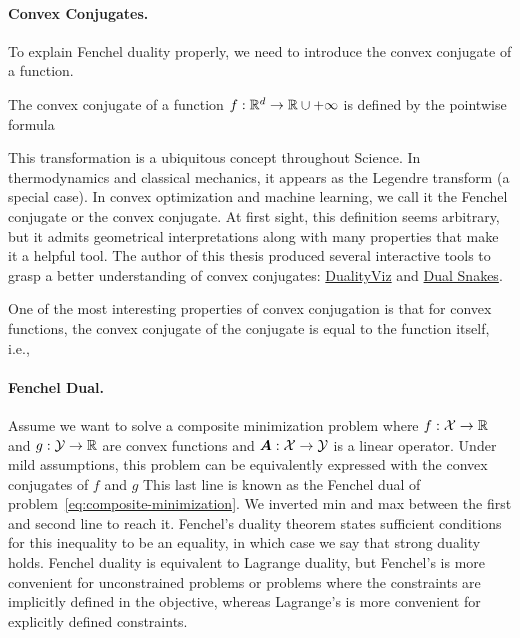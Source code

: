 \paragraph{Convex Conjugates.}
To explain Fenchel duality properly, we need to introduce the convex conjugate of a function.
\begin{definition}
	The convex conjugate of a function $f:\mathbb{R}^d \rightarrow \mathbb{R}\cup{+\infty}$ is defined by the pointwise formula
\end{definition}
This transformation is a ubiquitous concept throughout Science.
In thermodynamics and classical mechanics, it appears as the Legendre transform (a special case). In convex optimization and machine learning, we call it the Fenchel conjugate or the convex conjugate. 
At first sight, this definition seems arbitrary, but it admits geometrical interpretations along with many properties that make it a helpful tool. 
The author of this thesis produced several interactive tools to grasp a better understanding of convex conjugates: \href{https://remilepriol.github.io/dualityviz/}{DualityViz} and \href{https://remilepriol.github.io/dualityviz/dual_snakes.html}{Dual Snakes}.

One of the most interesting properties of convex conjugation is that for convex functions, the convex conjugate of the conjugate is equal to the function itself, i.e.,

\paragraph{Fenchel Dual.}
Assume we want to solve a composite minimization problem
where $f:{\mathcal X} \rightarrow\mathbb{R}$ and $g:{\mathcal Y} \rightarrow \mathbb{R}$ are convex functions and ${\bm{A}}: {\mathcal X} \rightarrow {\mathcal Y}$ is a linear operator.
Under mild assumptions, this problem can be equivalently expressed with the convex conjugates of $f$ and $g$
This last line is known as the Fenchel dual of problem~\eqref{eq:composite-minimization}. 
We inverted min and max between the first and second line to reach it. 
Fenchel's duality theorem states sufficient conditions for this inequality to be an equality, in which case we say that strong duality holds.
Fenchel duality is equivalent to Lagrange duality, but Fenchel's is more convenient for unconstrained problems or problems where the constraints are implicitly defined in the objective, whereas Lagrange's is more convenient for explicitly defined constraints.

